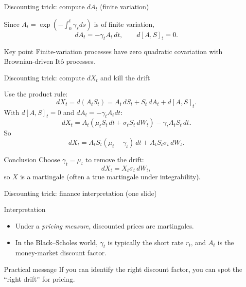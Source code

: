 \documentclass[10pt,aspectratio=169]{beamer}
\begin{document}
\begin{frame}{Discounting trick: compute $dA_t$ (finite variation)}

Since $A_t=\exp(-\int_0^t \gamma_s ds)$ is of finite variation,\pause
\[
dA_t = -\gamma_t A_t\,dt,
\qquad
d[A,S]_t=0.
\]\pause

\begin{alertblock}{Key point}
Finite-variation processes have zero quadratic covariation with Brownian-driven It\^o processes.
\end{alertblock}

\end{frame}

\begin{frame}{Discounting trick: compute $dX_t$ and kill the drift}

Use the product rule:
\[
dX_t = d(A_tS_t)=A_t\,dS_t+S_t\,dA_t+d[A,S]_t.
\]\pause
With $d[A,S]_t=0$ and $dA_t=-\gamma_tA_tdt$:\pause
\[
dX_t
=
A_t(\mu_t S_t\,dt+\sigma_t S_t\,dW_t)
-\gamma_tA_tS_t\,dt.
\]\pause
So
\[
dX_t
=
A_tS_t(\mu_t-\gamma_t)\,dt
+
A_tS_t\sigma_t\,dW_t.
\]\pause

\begin{alertblock}{Conclusion}
Choose \(\gamma_t=\mu_t\) to remove the drift:
\[
dX_t = X_t\sigma_t\,dW_t,
\]
so $X$ is a martingale (often a true martingale under integrability).
\end{alertblock}

\end{frame}

\begin{frame}{Discounting trick: finance interpretation (one slide)}

\begin{block}{Interpretation}
\begin{itemize}
  \item Under a \emph{pricing measure}, discounted prices are martingales.\pause
  \item In the Black--Scholes world, $\gamma_t$ is typically the short rate $r_t$,
  and $A_t$ is the money-market discount factor.\pause
\end{itemize}
\end{block}\pause

\begin{alertblock}{Practical message}
If you can identify the right discount factor, you can spot the “right drift” for pricing.
\end{alertblock}

\end{frame}
\end{document}
